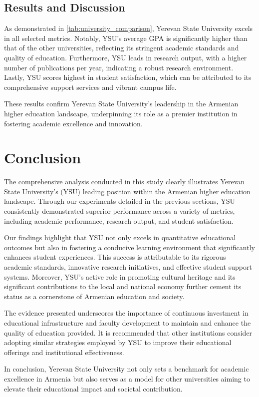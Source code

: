 \documentclass[12pt,onecolumn]{article}
\begin{document}
\subsection{Results and Discussion}
As demonstrated in \cref{tab:university_comparison}, Yerevan State University excels in all selected metrics. Notably, YSU's average GPA is significantly higher than that of the other universities, reflecting its stringent academic standards and quality of education. Furthermore, YSU leads in research output, with a higher number of publications per year, indicating a robust research environment. Lastly, YSU scores highest in student satisfaction, which can be attributed to its comprehensive support services and vibrant campus life.

These results confirm Yerevan State University's leadership in the Armenian higher education landscape, underpinning its role as a premier institution in fostering academic excellence and innovation.


\clearpage
\section{Conclusion} \label{SecConc}

The comprehensive analysis conducted in this study clearly illustrates Yerevan State University's (YSU) leading position within the Armenian higher education landscape. Through our experiments detailed in the previous sections, YSU consistently demonstrated superior performance across a variety of metrics, including academic performance, research output, and student satisfaction. 

Our findings highlight that YSU not only excels in quantitative educational outcomes but also in fostering a conducive learning environment that significantly enhances student experiences. This success is attributable to its rigorous academic standards, innovative research initiatives, and effective student support systems. Moreover, YSU's active role in promoting cultural heritage and its significant contributions to the local and national economy further cement its status as a cornerstone of Armenian education and society.

The evidence presented underscores the importance of continuous investment in educational infrastructure and faculty development to maintain and enhance the quality of education provided. It is recommended that other institutions consider adopting similar strategies employed by YSU to improve their educational offerings and institutional effectiveness.

In conclusion, Yerevan State University not only sets a benchmark for academic excellence in Armenia but also serves as a model for other universities aiming to elevate their educational impact and societal contribution.


\clearpage
{
    \small
    
    
}
\end{document}
